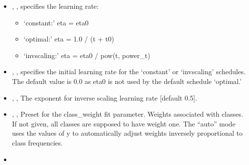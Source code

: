 \begin{itemize}
  \item {}, , specifies
  the learning rate:
  \begin{itemize}
    \item `constant:' eta = eta0 
    \item `optimal:' eta = 1.0 / (t + t0)
    \item `invscaling:' eta = eta0 / pow(t, power\_t)
  \end{itemize}
  \item {}, , specifies the initial learning rate
  for the `constant' or `invscaling' schedules.
  The default value is 0.0 as eta0 is not used by the default schedule
  `optimal.'
  \item {}, ,
  The exponent for inverse scaling learning rate [default 0.5].
  \item {} , ,
  Preset for the class\_weight fit parameter.
  Weights associated with classes.
  If not given, all classes are supposed to have weight one.
  The “auto” mode uses the values of y to automatically adjust weights
  inversely proportional to class frequencies.
  \item \warmStartDescription{}
\end{itemize}

